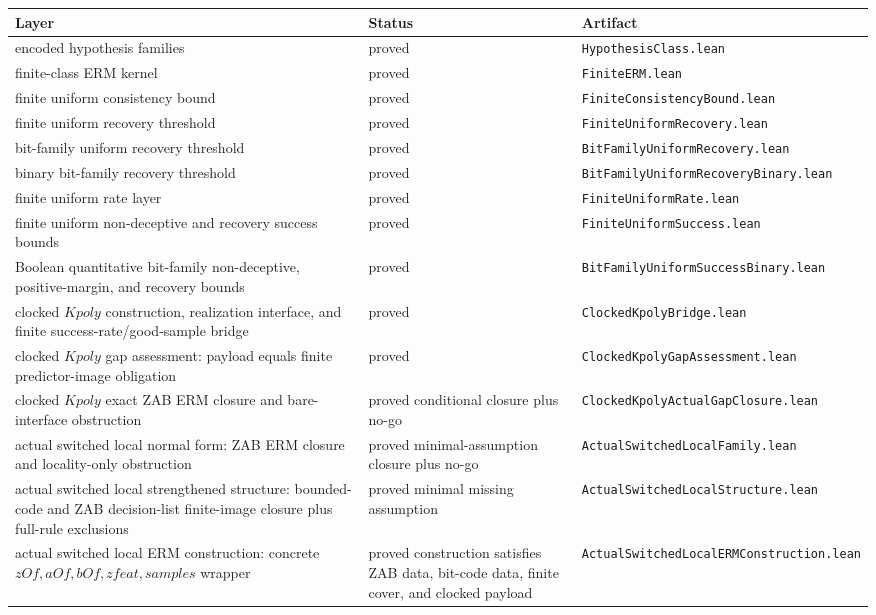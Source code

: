 \documentclass[11pt]{article}
\theoremstyle{remark}
\begin{document}
\begin{center}
\begin{tabular}{lll}
\toprule
\textbf{Layer} & \textbf{Status} & \textbf{Artifact} \\
\midrule
encoded hypothesis families & proved & \texttt{HypothesisClass.lean} \\
finite-class ERM kernel & proved & \texttt{FiniteERM.lean} \\
finite uniform consistency bound & proved & \texttt{FiniteConsistencyBound.lean} \\
finite uniform recovery threshold & proved & \texttt{FiniteUniformRecovery.lean} \\
bit-family uniform recovery threshold & proved & \texttt{BitFamilyUniformRecovery.lean} \\
binary bit-family recovery threshold & proved & \texttt{BitFamilyUniformRecoveryBinary.lean} \\
finite uniform rate layer & proved & \texttt{FiniteUniformRate.lean} \\
finite uniform non-deceptive and recovery success bounds & proved & \texttt{FiniteUniformSuccess.lean} \\
Boolean quantitative bit-family non-deceptive, positive-margin, and recovery bounds & proved & \texttt{BitFamilyUniformSuccessBinary.lean} \\
clocked \(Kpoly\) construction, realization interface, and finite success-rate/good-sample bridge & proved & \texttt{ClockedKpolyBridge.lean} \\
clocked \(Kpoly\) gap assessment: payload equals finite predictor-image obligation & proved & \texttt{ClockedKpolyGapAssessment.lean} \\
clocked \(Kpoly\) exact ZAB ERM closure and bare-interface obstruction & proved conditional closure plus no-go & \texttt{ClockedKpolyActualGapClosure.lean} \\
actual switched local normal form: ZAB ERM closure and locality-only obstruction & proved minimal-assumption closure plus no-go & \texttt{ActualSwitchedLocalFamily.lean} \\
actual switched local strengthened structure: bounded-code and ZAB decision-list finite-image closure plus full-rule exclusions & proved minimal missing assumption & \texttt{ActualSwitchedLocalStructure.lean} \\
actual switched local ERM construction: concrete \(zOf,aOf,bOf,zfeat,samples\) wrapper & proved construction satisfies ZAB data, bit-code data, finite cover, and clocked payload & \texttt{ActualSwitchedLocalERMConstruction.lean} \\

\end{tabular}
\end{center}
\end{document}
